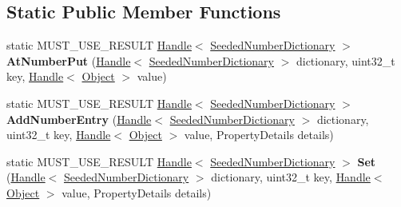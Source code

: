 \subsection*{Static Public Member Functions}
\begin{DoxyCompactItemize}
\item 
\hypertarget{classv8_1_1internal_1_1_seeded_number_dictionary_a12090224cc7770f197e81475e55876f4}{}static M\+U\+S\+T\+\_\+\+U\+S\+E\+\_\+\+R\+E\+S\+U\+L\+T \hyperlink{classv8_1_1internal_1_1_handle}{Handle}$<$ \hyperlink{classv8_1_1internal_1_1_seeded_number_dictionary}{Seeded\+Number\+Dictionary} $>$ {\bfseries At\+Number\+Put} (\hyperlink{classv8_1_1internal_1_1_handle}{Handle}$<$ \hyperlink{classv8_1_1internal_1_1_seeded_number_dictionary}{Seeded\+Number\+Dictionary} $>$ dictionary, uint32\+\_\+t key, \hyperlink{classv8_1_1internal_1_1_handle}{Handle}$<$ \hyperlink{classv8_1_1internal_1_1_object}{Object} $>$ value)\label{classv8_1_1internal_1_1_seeded_number_dictionary_a12090224cc7770f197e81475e55876f4}

\item 
\hypertarget{classv8_1_1internal_1_1_seeded_number_dictionary_ab268794507dcd3c8027659a63d94968d}{}static M\+U\+S\+T\+\_\+\+U\+S\+E\+\_\+\+R\+E\+S\+U\+L\+T \hyperlink{classv8_1_1internal_1_1_handle}{Handle}$<$ \hyperlink{classv8_1_1internal_1_1_seeded_number_dictionary}{Seeded\+Number\+Dictionary} $>$ {\bfseries Add\+Number\+Entry} (\hyperlink{classv8_1_1internal_1_1_handle}{Handle}$<$ \hyperlink{classv8_1_1internal_1_1_seeded_number_dictionary}{Seeded\+Number\+Dictionary} $>$ dictionary, uint32\+\_\+t key, \hyperlink{classv8_1_1internal_1_1_handle}{Handle}$<$ \hyperlink{classv8_1_1internal_1_1_object}{Object} $>$ value, Property\+Details details)\label{classv8_1_1internal_1_1_seeded_number_dictionary_ab268794507dcd3c8027659a63d94968d}

\item 
\hypertarget{classv8_1_1internal_1_1_seeded_number_dictionary_a43a89b74f815ae0670536477ba6dd99e}{}static M\+U\+S\+T\+\_\+\+U\+S\+E\+\_\+\+R\+E\+S\+U\+L\+T \hyperlink{classv8_1_1internal_1_1_handle}{Handle}$<$ \hyperlink{classv8_1_1internal_1_1_seeded_number_dictionary}{Seeded\+Number\+Dictionary} $>$ {\bfseries Set} (\hyperlink{classv8_1_1internal_1_1_handle}{Handle}$<$ \hyperlink{classv8_1_1internal_1_1_seeded_number_dictionary}{Seeded\+Number\+Dictionary} $>$ dictionary, uint32\+\_\+t key, \hyperlink{classv8_1_1internal_1_1_handle}{Handle}$<$ \hyperlink{classv8_1_1internal_1_1_object}{Object} $>$ value, Property\+Details details)\label{classv8_1_1internal_1_1_seeded_number_dictionary_a43a89b74f815ae0670536477ba6dd99e}

\end{DoxyCompactItemize}
